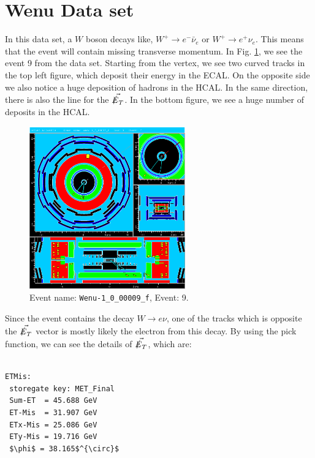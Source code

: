 \documentclass[a4paper]{report}
\numberwithin{equation}{section}
\begin{document}
\section{Wenu Data set}

In this data set, a $W$ boson decays like, $W^+ \rightarrow e^- \bar{\nu}_e$ or $W^+ \rightarrow e^+ \nu_e$. This means that the event will contain missing transverse momentum. In Fig. \ref{fig:wenu}, we see the event 9 from the data set. Starting from the vertex, we see two curved tracks in the top left figure, which deposit their energy in the ECAL. On the opposite side we also notice a huge deposition of hadrons in the HCAL. In the same direction, there is also the line for the $\vec{\slashed{E}_T}$. In the bottom figure, we see a huge number of deposits in the HCAL. 

\begin{figure}[htpb]
    \centering
    \includegraphics[width=0.6\textwidth]{Wenu-1_0_00009_f-YX-RZ-RZ-YX-2022-05-23-13-13-30}
    \caption{Event name: \texttt{Wenu-1\_0\_00009\_f}, Event: 9.}
    \label{fig:wenu}
\end{figure}

Since the event contains the decay $W \rightarrow e \nu$, one of the tracks which is opposite the $\vec{\slashed{E}_T}$ vector is mostly likely the electron from this decay. By using the pick function, we can see the details of $\vec{\slashed{E}_T}$, which are:

\begin{lstlisting}

ETMis:
 storegate key: MET_Final
 Sum-ET  = 45.688 GeV
 ET-Mis  = 31.907 GeV
 ETx-Mis = 25.086 GeV
 ETy-Mis = 19.716 GeV
 $\phi$ = 38.165$^{\circ}$
\end{lstlisting}
\end{document}
